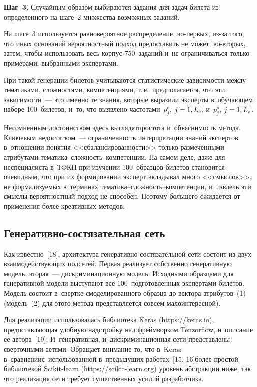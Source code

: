 \begin{multicols}{2}
  \textbf{Шаг~3.} Случайным образом выбираются задания для задач билета из 
определенного на шаге~2 множества возможных заданий.
  
  На шаге~3 используется равновероятное распределение, во-пер\-вых, из-за 
того, что иных оснований вероятностный подход предоставить не может,  
во-вто\-рых, затем, чтобы использовать весь корпус 750~заданий и~не 
ограничиваться только примерами, выбранными экспертами.
  
  При такой генерации билетов учитываются статистические зависимости 
между тематиками, сложностями, компетенциями, т.\,е.\ предполагается, 
что эти зависимости~--- это именно те знания, которые выразили эксперты 
в~обуча\-ющем наборе 100~билетов, и~то, что выявлено частотами~$p_j^e$, 
$j\hm= \overline{1, L_e}$, и~$p_j^s$, $j\hm= \overline{1, L_s}$.
  
  Несомненным достоинством здесь выглядят\linebreak простота и~объяснимость 
метода. Ключевым недостатком~--- ограниченность интерпретации знаний 
экспертов в~отношении понятия <<сбалансированности>> только 
размеченными атрибутами \mbox{те\-ма\-ти\-ка}--слож\-ность--ком\-пе\-тен\-ции. На 
самом деле, даже для неспециалиста в~ТФКП при изучении 100~образцов 
билетов становится очевидным, что при их формировании эксперт вкладывал 
много <<смыслов>>, не формализуемых в~терминах  
те\-ма\-ти\-ка--слож\-ность--ком\-пе\-тен\-ции, и~извлечь эти смыслы 
вероятностный подход не способен. Поэтому большего ожидается от 
применения более креативных методов.
  
\subsection{Генеративно-состязательная сеть}

  Как известно~[18], архитектура ге\-не\-ра\-тив\-но-со\-стя\-за\-тель\-ной сети состоит из двух 
взаимодействующих подсетей. Первая реализует собственно генеративную 
модель, вторая~--- дискриминационную модель. Исходными образцами для 
генеративной модели выступают все 100~подготовленных экспертами 
билетов. Модель состоит в~свертке смоделированного образца до вектора 
атрибутов~(1) (модель~(2) для этого метода представляется совсем 
малоинтересной).
  
  Для реализации использовалась библиотека Keras ({\sf https://keras.io}), 
предоставляющая удобную надстройку над фреймворком Tenzorflow, 
и~описание ее автора~[19]. И~генеративная, и~дискриминационная сети 
представлены сверточными сетями. Обращает внимание то, что в~Keras 
в~сравнении\linebreak с~использованной в~предыдущих работах~[15, 16]\linebreak более простой 
библиотекой Scikit-learn ({\sf https://\linebreak scikit-learn.org}) уровень абстракции 
ниже, так что реализация сети требует существенных усилий разработчика.
  

\end{multicols}
